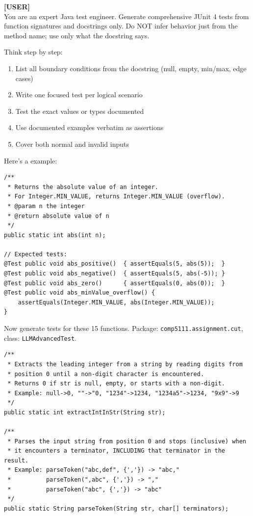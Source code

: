 \documentclass[acmsmall,nonacm]{acmart}
\begin{document}
\begin{promptbox}
\textbf{[USER]}\\[4pt]
You are an expert Java test engineer. Generate comprehensive JUnit 4 tests from function signatures
and docstrings only. Do NOT infer behavior just from the method name; use only what the docstring says.

Think step by step:
\begin{enumerate}[nosep]
  \item List all boundary conditions from the docstring (null, empty, min/max, edge cases)
  \item Write one focused test per logical scenario
  \item Test the exact values or types documented
  \item Use documented examples verbatim as assertions
  \item Cover both normal and invalid inputs
\end{enumerate}

Here's a example:

\begin{verbatim}
/**
 * Returns the absolute value of an integer.
 * For Integer.MIN_VALUE, returns Integer.MIN_VALUE (overflow).
 * @param n the integer
 * @return absolute value of n
 */
public static int abs(int n);

// Expected tests:
@Test public void abs_positive()  { assertEquals(5, abs(5));  }
@Test public void abs_negative()  { assertEquals(5, abs(-5)); }
@Test public void abs_zero()      { assertEquals(0, abs(0));  }
@Test public void abs_minValue_overflow() {
    assertEquals(Integer.MIN_VALUE, abs(Integer.MIN_VALUE));
}
\end{verbatim}

Now generate tests for these 15 functions. Package: \texttt{comp5111.assignment.cut},
class: \texttt{LLMAdvancedTest}.

\begin{verbatim}
/**
 * Extracts the leading integer from a string by reading digits from
 * position 0 until a non-digit character is encountered.
 * Returns 0 if str is null, empty, or starts with a non-digit.
 * Example: null->0, ""->"0, "1234"->1234, "1234a5"->1234, "9x9"->9
 */
public static int extractIntInStr(String str);

/**
 * Parses the input string from position 0 and stops (inclusive) when
 * it encounters a terminator, INCLUDING that terminator in the result.
 * Example: parseToken("abc,def", {','}) -> "abc,"
 *          parseToken(",abc", {','}) -> ","
 *          parseToken("abc", {','}) -> "abc"
 */
public static String parseToken(String str, char[] terminators);


\end{verbatim}
\end{promptbox}
\end{document}
